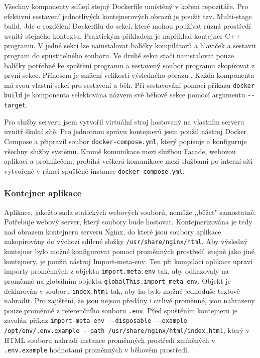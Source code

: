 Všechny komponenty sdílejí stejný Dockerfile umístěný v kořeni repozitáře. Pro efektivní sestavení jednotlivých kontejnerových obrazů je použit tzv. Multi-stage build. Jde o rozdělení Dockerfilu do sekcí, které mohou používat různá prostředí uvnitř stejného kontextu. Praktickým příkladem je například kontejner C++ programu. V jedné sekci lze nainstalovat balíčky kompilátorů a hlaviček a sestavit program do spustitelného souboru. Ve druhé sekci stačí nainstalovat pouze balíčky potřebné ke spuštění programu a sestavený soubor programu zkopírovat z první sekce. Přínosem je snížení velikosti výsledného obrazu \cite{MultistageBuilds0100}. Každá komponenta má svou vlastní sekci pro sestavení a běh. Při sestavování pomocí příkazu \lstinline|docker build| je komponenta selektována názvem své běhové sekce pomocí argumentu \lstinline|--target|.

Pro služby serveru jsem vytvořil virtuální stroj hostovaný na vlastním serveru uvnitř školní sítě. Pro jednotnou správu kontejnerů jsem použil nástroj Docker Compose a připravil soubor \lstinline|docker-compose.yml|, který popisuje a konfiguruje všechny služby systému. Kromě komunikace mezi službou Facade, webovou aplikací a prohlížečem, probíhá veškerá komunikace mezi službami po interní síti vytvořené v rámci spuštěné instance \lstinline|docker-compose.yml|. 

\subsubsection{Kontejner aplikace}
Aplikace, jakožto sada statických webových souborů, nemůže ,,běžet" samostatně. Potřebuje webový server, který soubory bude hostovat. Kontejnerizována je tedy nad obrazem kontejneru serveru Nginx, do které jsou soubory aplikace nakopírovány do výchozí sdílené složky \lstinline|/usr/share/nginx/html|. Aby výsledný kontejner bylo možné konfigurovat pomocí proměnných prostředí, stejně jako jiné kontejnery, je použit nástroj Import-meta-env. Ten při kompilaci aplikace upraví importy proměnných z objektu \lstinline|import.meta.env| tak, aby odkazovaly na proměnné na globálním objektu \lstinline|globalThis.import_meta_env|. Objekt je deklarován v souboru \lstinline|index.html| tak, aby ho bylo možné jednoduše textově nahradit. Pro zajištění, že jsou nejsou předány i citlivé proměnné, jsou nahrazeny pouze proměnné z referenčního souboru \lstinline|.env|. Před spuštěním kontejneru je zavolán příkaz \lstinline|import-meta-env --disposable --example /opt/env/.env.example --path /usr/share/nginx/html/index.html|, který v HTML souboru nahradí instance proměnných prostředí zmíněných v \lstinline|.env.example| hodnotami proměnných v běhovém prostředí.

